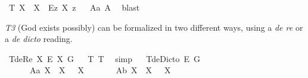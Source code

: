 \begin{isabellebody}
\begin{isamarkuptext}
\end{isamarkuptext}\isamarkuptrue%
\isamarkupfalse%
\ T{}{\isacharcolon}\ {\isachardoublequoteopen}{\isasymlfloor}\isactrlbold {\isasymforall}X{\isacharcolon}{\isacharcolon}{\isasymlangle}{\isasymzero}{\isasymrangle}{\isachardot}\ {\isasymP}\ X\ \isactrlbold {\isasymrightarrow}\ \isactrlbold {\isasymdiamond}{\isacharparenleft}\isactrlbold {\isasymexists}\isactrlsup Ez{\isachardot}\ {\isasymlparr}X\ z{\isasymrparr}{\isacharparenright}{\isasymrfloor}{\isachardoublequoteclose}%
\ %
%
\isamarkupfalse%
\ A{}a\ A{}\ \isamarkupfalse%
\ blast%
%
%
%
\begin{isamarkuptext}%
\emph{T3} (God exists possibly) can be formalized in two different ways, using a \emph{de re} or a \emph{de dicto} reading.%
\end{isamarkuptext}\isamarkuptrue%
\isamarkupfalse%
\ T{}{\isacharunderscore}deRe{\isacharcolon}\ {\isachardoublequoteopen}{\isasymlfloor}{\isacharparenleft}{\isasymlambda}X{\isachardot}\ \isactrlbold {\isasymdiamond}\isactrlbold {\isasymexists}\isactrlsup E\ X{\isacharparenright}\ \isactrlbold {\isasymdown}G{\isasymrfloor}{\isachardoublequoteclose}%
\ %
%
\isamarkupfalse%
\ T{}\ T{}\ \isamarkupfalse%
\ simp%
%
%
\ \isanewline
{}\isamarkupfalse%
\ T{}{\isacharunderscore}deDicto{\isacharcolon}\ {\isachardoublequoteopen}{\isasymlfloor}\isactrlbold {\isasymdiamond}\isactrlbold {\isasymexists}\isactrlsup E\ \isactrlbold {\isasymdown}G{\isasymrfloor}{\isachardoublequoteclose}\ \isamarkupfalse%
%
\ %
%
\isamarkupfalse%
\ %
%
%
%
%
\isamarkuptrue%
\isamarkupfalse%
\ \isanewline
\ \ \ \ \ \ A{}a{\isacharcolon}\ {\isachardoublequoteopen}{\isasymlfloor}\isactrlbold {\isasymforall}X{\isachardot}\ {\isasymP}\ X\ \isactrlbold {\isasymrightarrow}\ \isactrlbold {\isasymbox}{\isacharparenleft}{\isasymP}\ X{\isacharparenright}{\isasymrfloor}{\isachardoublequoteclose}\ \ \ \ \ \ %
\isanewline
{}\isamarkupfalse%
\ A{}b{\isacharcolon}\ {\isachardoublequoteopen}{\isasymlfloor}\isactrlbold {\isasymforall}X{\isachardot}\ \isactrlbold {\isasymnot}{\isacharparenleft}{\isasymP}\ X{\isacharparenright}\ \isactrlbold {\isasymrightarrow}\ \isactrlbold {\isasymbox}\isactrlbold {\isasymnot}{\isacharparenleft}{\isasymP}\ X{\isacharparenright}{\isasymrfloor}{\isachardoublequoteclose}%

\end{isabellebody}
